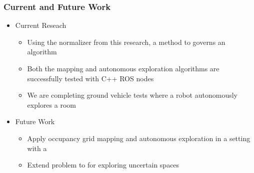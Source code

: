 \documentclass[11pt,professionalfonts,hyperref={pdftex,pdfpagemode=none,pdfstartview=FitH}]{beamer}
\renewcommand{\emph}[1]{\textit{\textbf{\color{blue}{#1}}}}
\begin{document}
\begin{frame}
\frametitle{Current and Future Work}
\begin{itemize}
    \item Current Reseach
    \begin{itemize}
        	\item Using the normalizer from this research, a method to \emph{predict map information gain} governs an \emph{autonomous exploration} algorithm
	\item Both the mapping and autonomous exploration algorithms are successfully tested with C++ ROS nodes
	\item We are completing ground vehicle tests where a robot autonomously explores a room
    \end{itemize}
    \item Future Work
    \begin{itemize}
        	\item Apply occupancy grid mapping and autonomous exploration in a \emph{3D} setting with a \emph{flying robot}
	\item Extend problem to \emph{multiple vehicles} for exploring uncertain spaces
    \end{itemize}
\end{itemize}
\end{frame}
\end{document}
